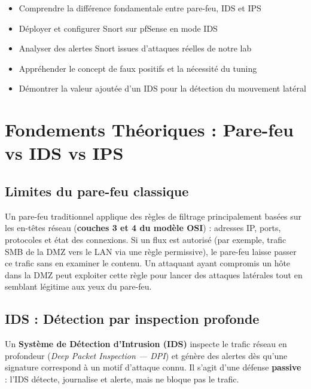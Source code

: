 \documentclass[12pt,a4paper,openany]{report}
\begin{document}
\begin{tcolorbox}[colback=primary!5!white, colframe=primary, title=\textbf{Objectifs de ce Chapitre}]
\begin{itemize}
    \item Comprendre la différence fondamentale entre pare-feu, IDS et IPS
    \item Déployer et configurer Snort sur pfSense en mode IDS
    \item Analyser des alertes Snort issues d'attaques réelles de notre lab
    \item Appréhender le concept de faux positifs et la nécessité du tuning
    \item Démontrer la valeur ajoutée d'un IDS pour la détection du mouvement latéral
\end{itemize}
\end{tcolorbox}

\section{Fondements Théoriques : Pare-feu vs IDS vs IPS}

\subsection{Limites du pare-feu classique}

Un pare-feu traditionnel applique des règles de filtrage principalement basées sur les en-têtes réseau
(\textbf{couches 3 et 4 du modèle OSI}) : adresses IP, ports, protocoles et état des connexions. Si un
flux est autorisé (par exemple, trafic SMB de la DMZ vers le LAN via une règle permissive), le pare-feu
laisse passer ce trafic sans en examiner le contenu. Un attaquant ayant compromis un hôte dans la DMZ
peut exploiter cette règle pour lancer des attaques latérales tout en semblant légitime aux yeux du
pare-feu.

\subsection{IDS : Détection par inspection profonde}

Un \textbf{Système de Détection d'Intrusion (IDS)} inspecte le trafic réseau en profondeur
(\textit{Deep Packet Inspection — DPI}) et génère des alertes dès qu'une signature correspond à un
motif d'attaque connu. Il s'agit d'une défense \textbf{passive} : l'IDS détecte, journalise et alerte,
mais ne bloque pas le trafic.
\end{document}
